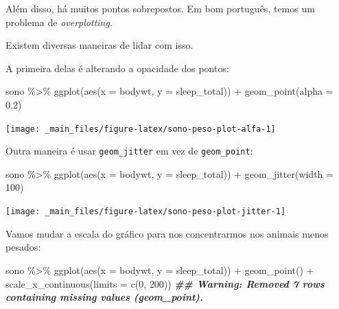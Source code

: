 \documentclass[
  12pt]{report}
\newenvironment{Shaded}{\begin{snugshade}}{\end{snugshade}}
\newcommand{\AttributeTok}[1]{\textcolor[rgb]{0.77,0.63,0.00}{#1}}
\newcommand{\DecValTok}[1]{\textcolor[rgb]{0.00,0.00,0.81}{#1}}
\newcommand{\DocumentationTok}[1]{\textcolor[rgb]{0.56,0.35,0.01}{\textbf{\textit{#1}}}}
\newcommand{\FloatTok}[1]{\textcolor[rgb]{0.00,0.00,0.81}{#1}}
\newcommand{\FunctionTok}[1]{\textcolor[rgb]{0.00,0.00,0.00}{#1}}
\newcommand{\NormalTok}[1]{#1}
\newcommand{\SpecialCharTok}[1]{\textcolor[rgb]{0.00,0.00,0.00}{#1}}
\begin{document}
Além disso, há muitos pontos sobrepostos. Em bom português, temos um problema de \emph{overplotting}.

Existem diversas maneiras de lidar com isso.

A primeira delas é alterando a opacidade dos pontos:

\begin{Shaded}
\begin{Highlighting}[]
\NormalTok{sono }\SpecialCharTok{\%\textgreater{}\%} 
  \FunctionTok{ggplot}\NormalTok{(}\FunctionTok{aes}\NormalTok{(}\AttributeTok{x =}\NormalTok{ bodywt, }\AttributeTok{y =}\NormalTok{ sleep\_total)) }\SpecialCharTok{+}
    \FunctionTok{geom\_point}\NormalTok{(}\AttributeTok{alpha =} \FloatTok{0.2}\NormalTok{)}
\end{Highlighting}
\end{Shaded}

\begin{center}\texttt{[image: \_main\_files/figure-latex/sono-peso-plot-alfa-1]} \end{center}

Outra maneira é usar \texttt{geom\_jitter} em vez de \texttt{geom\_point}:

\begin{Shaded}
\begin{Highlighting}[]
\NormalTok{sono }\SpecialCharTok{\%\textgreater{}\%} 
  \FunctionTok{ggplot}\NormalTok{(}\FunctionTok{aes}\NormalTok{(}\AttributeTok{x =}\NormalTok{ bodywt, }\AttributeTok{y =}\NormalTok{ sleep\_total)) }\SpecialCharTok{+}
    \FunctionTok{geom\_jitter}\NormalTok{(}\AttributeTok{width =} \DecValTok{100}\NormalTok{)}
\end{Highlighting}
\end{Shaded}

\begin{center}\texttt{[image: \_main\_files/figure-latex/sono-peso-plot-jitter-1]} \end{center}

Vamos mudar a escala do gráfico para nos concentrarmos nos animais menos pesados:

\begin{Shaded}
\begin{Highlighting}[]
\NormalTok{sono }\SpecialCharTok{\%\textgreater{}\%} 
  \FunctionTok{ggplot}\NormalTok{(}\FunctionTok{aes}\NormalTok{(}\AttributeTok{x =}\NormalTok{ bodywt, }\AttributeTok{y =}\NormalTok{ sleep\_total)) }\SpecialCharTok{+}
    \FunctionTok{geom\_point}\NormalTok{() }\SpecialCharTok{+}
    \FunctionTok{scale\_x\_continuous}\NormalTok{(}\AttributeTok{limits =} \FunctionTok{c}\NormalTok{(}\DecValTok{0}\NormalTok{, }\DecValTok{200}\NormalTok{))}
\DocumentationTok{\#\# Warning: Removed 7 rows containing missing values (geom\_point).}
\end{Highlighting}
\end{Shaded}
\end{document}
